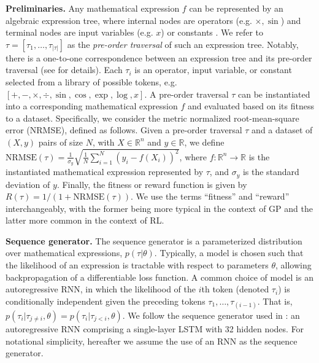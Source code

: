 \documentclass{article}
\begin{document}
\textbf{Preliminaries.}
Any mathematical expression $f$ can be represented by an algebraic expression tree, where internal nodes are operators (e.g. $\times, \sin$) and terminal nodes are input variables (e.g. $x$) or constants \citep{petersen2019deep}.
We refer to $\tau = [\tau_1, \dots, \tau_{|\tau|}]$ as the \textit{pre-order traversal} of such an expression tree.
Notably, there is a one-to-one correspondence between an expression tree and its pre-order traversal (see \citet{petersen2019deep} for details).
Each $\tau_i$ is an operator, input variable, or constant selected from a library of possible tokens, e.g. $[+, -, \times, \div, \sin, \cos, \exp, \log, x]$.
A pre-order traversal $\tau$ can be instantiated into a corresponding mathematical expression $f$ and evaluated based on its fitness to a dataset.
Specifically, we consider the metric normalized root-mean-square error (NRMSE), defined as follows.
Given a pre-order traversal $\tau$ and a dataset of $(X, y)$ pairs of size $N$, with $X\in\mathbb{R}^n$ and $y\in\mathbb{R}$, we define $\textrm{NRMSE}(\tau) = \frac{1}{\sigma_y} \sqrt{\frac{1}{N}\sum_{i=1}^N \left(y_i - f\left(X_i\right)\right)^2}$, where $f : \mathbb{R}^n \rightarrow \mathbb{R}$ is the instantiated mathematical expression represented by $\tau$, and $\sigma_y$ is the standard deviation of $y$.
Finally, the fitness or reward function is given by $R(\tau) = 1/(1 + \textrm{NRMSE}(\tau))$.
We use the terms ``fitness'' and ``reward'' interchangeably, with the former being more typical in the context of GP and the latter more common in the context of RL.

\textbf{Sequence generator.}
The sequence generator is a parameterized distribution over mathematical expressions, $p(\tau|\theta)$.
Typically, a model is chosen such that the likelihood of an expression is tractable with respect to parameters $\theta$, allowing backpropagation of a differentiable loss function.
A common choice of model is an autoregressive RNN, in which the likelihood of the $i$th token (denoted $\tau_i$) is conditionally independent given the preceding tokens $\tau_1, \dots, \tau_{(i-1)}$.
That is, $p(\tau_i|\tau_{j\neq i},\theta) = p(\tau_i|\tau_{j<i}, \theta)$.
We follow the sequence generator used in \citet{petersen2019deep}: an autoregressive RNN comprising a single-layer LSTM with 32 hidden nodes.
For notational simplicity, hereafter we assume the use of an RNN as the sequence generator.
\end{document}
